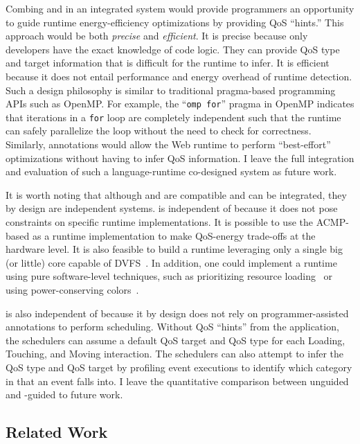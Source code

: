 Combing \greenweb and \webrt in an integrated system would provide programmers an opportunity to guide runtime energy-efficiency optimizations by providing QoS ``hints.'' This approach would be both \textit{precise} and \textit{efficient}. It is precise because only developers have the exact knowledge of code logic. They can provide QoS type and target information that is difficult for the runtime to infer. It is efficient because it does not entail performance and energy overhead of runtime detection. Such a design philosophy is similar to traditional pragma-based programming APIs such as OpenMP. For example, the ``\texttt{omp for}'' pragma in OpenMP indicates that iterations in a \texttt{for} loop are completely independent such that the runtime can safely parallelize the loop without the need to check for correctness. Similarly, \greenweb annotations would allow the Web runtime to perform ``best-effort'' optimizations without having to infer QoS information. I leave the full integration and evaluation of such a language-runtime co-designed system as future work.

It is worth noting that although \greenweb and \webrt are compatible and can be integrated, they by design are independent systems. \greenweb is independent of \webrt because it does not pose constraints on specific runtime implementations. It is possible to use the ACMP-based \webrt as a \greenweb runtime implementation to make QoS-energy trade-offs at the hardware level. It is also feasible to build a runtime leveraging only a single big (or little) core capable of DVFS~\cite{pgdvfs, vsmp}. In addition, one could implement a \greenweb runtime using pure software-level techniques, such as prioritizing resource loading~\cite{klotski} or using power-conserving colors~\cite{chameleon}. 

\webrt is also independent of \greenweb because it by design does not rely on programmer-assisted annotations to perform scheduling. Without QoS ``hints'' from the application, the \webrt schedulers can assume a default QoS target and QoS type for each Loading, Touching, and Moving interaction. The \webrt schedulers can also attempt to infer the QoS type and QoS target by profiling event executions to identify which category in  that an event falls into. I leave the quantitative comparison between unguided and \greenweb-guided \webrt to future work.

\subsection{Related Work}
\label{sec:lang:related}

